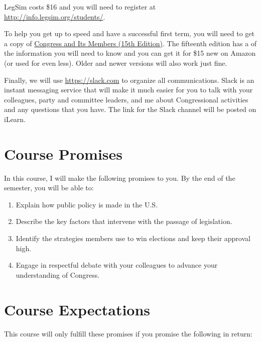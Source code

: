 \documentclass[11pt]{article}
\begin{document}
LegSim costs \$16 and you will need to register at \href{http://info.legsim.org/students/}{http://info.legsim.org/students/}.

To help you get up to speed and have a successful first term, you will need to get a copy of \href{https://www.amazon.com/Congress-Its-Members-Roger-Davidson/dp/1483388883}{Congress and Its Members (15th Edition)}. The fifteenth edition has a of the information you will need to know and you can get it for \$15 new on Amazon (or used for even less). Older and newer versions will also work just fine. 

Finally, we will use \href{Slack}{https://slack.com} to organize all communications. Slack is an instant messaging service that will make it much easier for you to talk with your colleagues, party and committee leaders, and me about Congressional activities and any questions that you have. The link for the Slack channel will be posted on iLearn.
  

\section*{Course Promises}

In this course, I will make the following promises to you. By the end of the semester, you will be able to:

\begin{enumerate}
	\item Explain how public policy is made in the U.S. 
	\item Describe the key factors that intervene with the passage of legislation.
	\item Identify the strategies members use to win elections and keep their approval high.
	\item Engage in respectful debate with your colleagues to advance your understanding of Congress.
\end{enumerate}


\section*{Course Expectations}

This course will only fulfill these promises if you promise the following in return:
\end{document}
